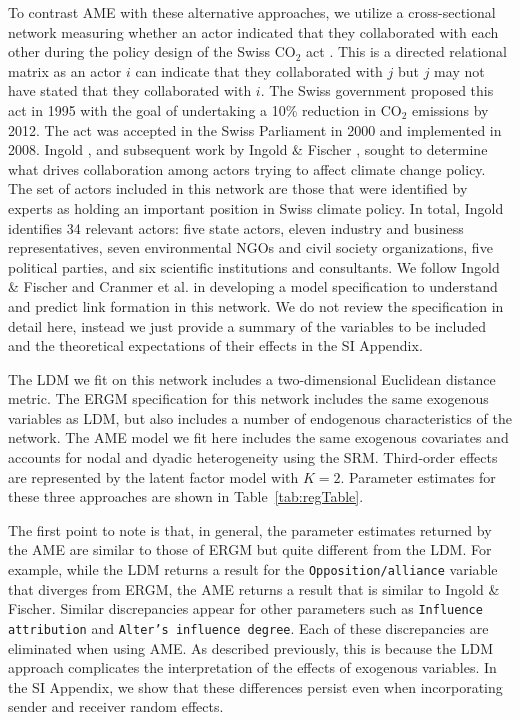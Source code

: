 \documentclass[12pt,twocolumn,twoside]{pnas-new}
\begin{document}
To contrast AME with these alternative approaches, we utilize a cross-sectional network measuring whether an actor indicated that they collaborated with each other during the policy design of the Swiss CO$_{2}$ act \citep{ingold:2008}. This is a directed relational matrix as an actor $i$ can indicate that they collaborated with $j$ but $j$ may not have stated that they collaborated with $i$. The Swiss government proposed this act in 1995 with the goal of undertaking a 10\% reduction in CO$_{2}$ emissions by 2012. The act was accepted in the Swiss Parliament in 2000 and implemented in 2008. Ingold \cite{ingold:2008}, and subsequent work by Ingold \& Fischer \cite{ingold:fischer:2014}, sought to determine what drives collaboration among actors trying to affect climate change policy. The set of actors included in this network are those that were identified by experts as holding an important position in Swiss climate policy. In total, Ingold identifies 34 relevant actors: five state actors, eleven industry and business representatives, seven environmental NGOs and civil society organizations, five political parties, and six scientific institutions and consultants. We follow Ingold \& Fischer and Cranmer et al. \cite{cranmer:etal:2016} in developing a model specification to understand and predict link formation in this network. We do not review the specification in detail here, instead we just provide a summary of the variables to be included and the theoretical expectations of their effects in the SI Appendix.

The LDM we fit on this network includes a two-dimensional Euclidean distance metric. The ERGM specification for this network includes the same exogenous variables as LDM, but also includes a number of endogenous characteristics of the network. The AME model we fit here includes the same exogenous covariates and accounts for nodal and dyadic heterogeneity using the SRM. Third-order effects are represented by the latent factor model with $K=2$. Parameter estimates for these three approaches are shown in Table~\ref{tab:regTable}.

The first point to note is that, in general, the parameter estimates returned by the AME are similar to those of ERGM but quite different from the LDM. For example, while the LDM returns a result for the \texttt{Opposition/alliance} variable that diverges from ERGM, the AME returns a result that is similar to Ingold \& Fischer. Similar discrepancies appear for other parameters such as \texttt{Influence attribution} and \texttt{Alter's influence degree}. Each of these discrepancies are eliminated when using AME. As described previously, this is because the LDM approach complicates the interpretation of the effects of exogenous variables. In the SI Appendix, we show that these differences persist even when incorporating sender and receiver random effects.
\end{document}
